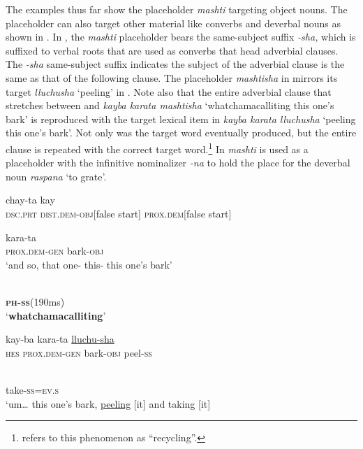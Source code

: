 \documentclass[output=paper]{langscibook}
\begin{document}
\largerpage
The examples thus far show the placeholder \textit{mashti} targeting object nouns. The placeholder can also target other material like converbs and deverbal nouns as shown in . In , the \textit{mashti} placeholder bears the same-subject suffix \textit{{}-sha,} which is suffixed to verbal roots that are used as converbs that head adverbial clauses. The \textit{{}-sha} same-subject suffix indicates the subject of the adverbial clause is the same as that of the following clause. The placeholder \textit{mashtisha} in  mirrors its target \textit{lluchusha} ‘peeling’ in . Note also that the entire adverbial clause that stretches between  and  \textit{kayba karata mashtisha} ‘whatchamacalliting this one’s bark’ is reproduced with the target lexical item in  \textit{kayba karata lluchusha} ‘peeling this one’s bark’. Not only was the target word eventually produced, but the entire clause is repeated with the correct target word.\footnote{\citet[23]{Podlesskaya2010} refers to this phenomenon as “recycling”.} In  \textit{mashti} is used as a placeholder with the infinitive nominalizer \textit{{}-na} to hold the place for the deverbal noun \textit{raspana} ‘to grate’. 

\ea%
\label{ex:rice:10}
\ea \label{ex:rice:10a}  {chay-ta} {kay} \\
{\textsc{dsc.prt}}  {{\textsc{dist.dem-obj}}[false start]} {\textsc{prox.dem}[false start]}\\
\medskip

 {kara-ta}\\
{\textsc{prox.dem-gen}}  {bark-\textsc{obj}}\\
\glt ‘and so, that one- this- this one’s bark’
\medskip

\ex \label{ex:rice:10b}  {}\\
{\textbf{\textsc{ph-ss}}\textsc{(190}ms)} {}\\
\glt ‘\textbf{whatchamacalliting}’
\medskip

\ex  \label{ex:rice:10c} {kay-ba} {kara-ta} {\uline{lluchu-sha}} \\
{\textsc{hes}}  {\textsc{prox.dem-gen}}  {bark-\textsc{obj}}  {peel-\textsc{ss}}\\
\medskip

 {}\\
{take-\textsc{ss=ev.s}} {} \\
\glt  ‘um… this one’s bark, \uline{peeling} [it] and taking [it]
\medskip
\end{document}

